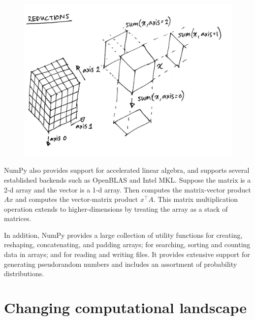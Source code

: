 \begin{figure}
  \centering
  \includegraphics[width=\linewidth]{static/sketches/reductions}
  \caption{
   }
  \label{fig:reductions}
\end{figure}

NumPy also provides support for accelerated linear algebra, and supports
several established backends such as OpenBLAS and Intel MKL.
Suppose the matrix  is a 2-d array and the vector  is a 1-d array.
Then  computes the matrix-vector product $Ax$ and  computes
the vector-matrix product $x^\top A$.
This matrix multiplication operation extends to higher-dimensions by treating
the array as a stack of matrices.

In addition, NumPy provides a large collection of utility functions for
creating, reshaping, concatenating, and padding arrays; for searching, sorting
and counting data in arrays; and for reading and writing files.
It provides extensive support for generating pseudorandom numbers and includes
an assortment of probability distributions.


\section*{Changing computational landscape}



